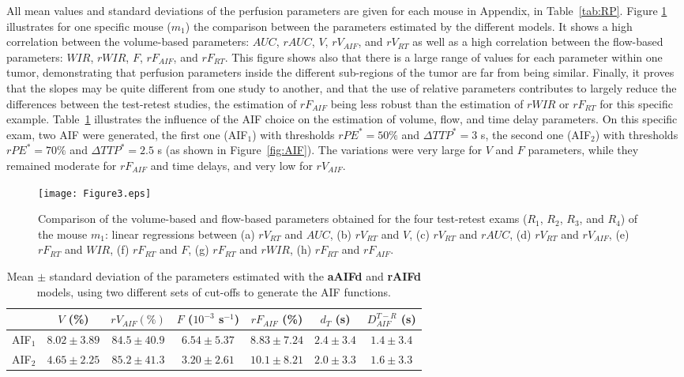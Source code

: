 All mean values and standard deviations of the perfusion parameters are given for each mouse in Appendix, in Table~\ref{tab:RP}.  
Figure \ref{fig:Slopes} illustrates for one specific mouse ($m_1$) the comparison between the parameters estimated by the different models. It shows a high correlation between the  volume-based parameters: $AUC$, $rAUC$, $V$, $rV_{AIF}$, and $rV_{RT}$ as well as a high correlation between the  flow-based parameters: $WIR$, $rWIR$, $F$, $rF_{AIF}$, and $rF_{RT}$. This figure shows also that there is a large range of values for each parameter within one tumor, demonstrating that perfusion parameters inside the different sub-regions of the tumor are far from being similar. Finally, it proves  that the slopes may be quite different from one study to another, and that the use of relative parameters contributes to largely reduce the differences between the test-retest studies, the estimation of $rF_{AIF}$ being less robust than the estimation of $rWIR$ or $rF_{RT}$ for this specific example. Table~\ref{tab:AIF} illustrates the influence of the AIF choice on the estimation of volume, flow, and time delay parameters. On this specific exam, two AIF were generated, the first one (AIF$_1$) with thresholds $rPE^{*}=50\%$ and $\Delta TTP^{*}=3$ s, the second one (AIF$_2$) with thresholds $rPE^{*}=70\%$ and $\Delta TTP^{*}=2.5$ s (as shown in Figure~\ref{fig:AIF}). The variations were very large for $V$ and $F$ parameters, while they remained moderate for $rF_{AIF}$ and time delays, and very low for $rV_{AIF}$.

\begin{figure}[ht]
  \centering
  \texttt{[image: Figure3.eps]}
  \caption{Comparison of the volume-based and flow-based parameters obtained for the four test-retest exams ($R_1$, $R_2$, $R_3$, and $R_4$) of the mouse $m_1$: linear regressions between (a) $rV_{RT}$ and $AUC$, (b) $rV_{RT}$ and $V$, (c) $rV_{RT}$ and $rAUC$, (d) $rV_{RT}$ and $rV_{AIF}$, (e) $rF_{RT}$ and $WIR$, (f) $rF_{RT}$ and $F$, (g) $rF_{RT}$ and $rWIR$, (h) $rF_{RT}$ and $rF_{AIF}$.}
\label{fig:Slopes}
\end{figure}

\begin{table}[ht]
\begin{center}
\begin{tabular}{ccccccc}
\toprule
& $V$ (\%) & $rV_{AIF} (\%) $ & $F$ ($10^{-3}$ s$^{-1}$) & $rF_{AIF}$ (\%)& $d_T$ (s) & $D_{AIF}^{T-R}$ (s) \\
\midrule
AIF$_1$ & $8.02 \pm 3.89$ 	& $84.5 \pm 40.9$ 
		& $6.54 \pm 5.37$ 	& $8.83 \pm 7.24$ 
		& $2.4 \pm 3.4$ 	& $1.4 \pm 3.4$ \\
AIF$_2$ &$4.65 \pm 2.25$ 	& $85.2 \pm 41.3$ 
		& $3.20 \pm 2.61$ 	& $10.1 \pm 8.21$ 
		& $2.0 \pm 3.3$ 	& $1.6 \pm 3.3$ \\
\bottomrule
\end{tabular}
\caption{Mean $\pm$ standard deviation of the parameters estimated with the \textbf{aAIFd} and  \textbf{rAIFd} models, using two different sets of cut-offs to generate the AIF functions.}
\label{tab:AIF}
\end{center}
\end{table}

